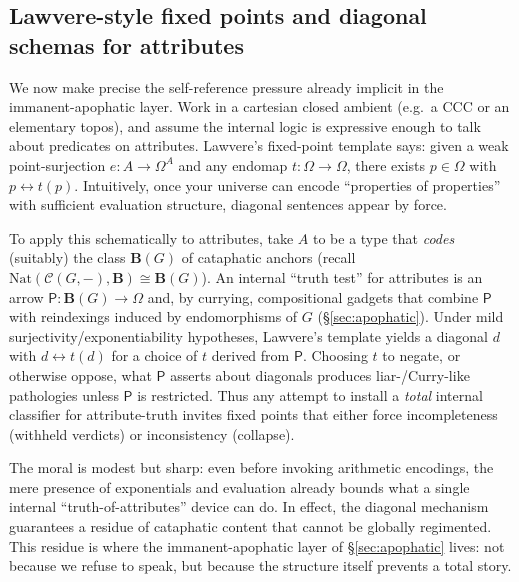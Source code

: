\documentclass[11pt]{article}
\theoremstyle{upright}
\begin{document}
\subsection{Lawvere-style fixed points and diagonal schemas for attributes}
We now make precise the self-reference pressure already implicit in the immanent-apophatic layer. Work in a cartesian closed ambient (e.g.\ a CCC or an elementary topos), and assume the internal logic is expressive enough to talk about predicates on attributes. Lawvere’s fixed-point template says: given a weak point-surjection \(e:A\to \Omega^{A}\) and any endomap \(t:\Omega\to\Omega\), there exists \(p\in\Omega\) with \(p \leftrightarrow t(p)\). Intuitively, once your universe can encode “properties of properties” with sufficient evaluation structure, diagonal sentences appear by force.

To apply this schematically to attributes, take \(A\) to be a type that \emph{codes} (suitably) the class \(\mathbf B(G)\) of cataphatic anchors (recall \(\mathrm{Nat}(\mathcal C(G,-),\mathbf B)\cong \mathbf B(G)\)). An internal “truth test” for attributes is an arrow \(\mathsf{P}:\mathbf B(G)\to\Omega\) and, by currying, compositional gadgets that combine \(\mathsf{P}\) with reindexings induced by endomorphisms of \(G\) (\S\ref{sec:apophatic}). Under mild surjectivity/exponentiability hypotheses, Lawvere’s template yields a diagonal \(d\) with \(d \leftrightarrow t(d)\) for a choice of \(t\) derived from \(\mathsf{P}\). Choosing \(t\) to negate, or otherwise oppose, what \(\mathsf{P}\) asserts about diagonals produces liar-/Curry-like pathologies unless \(\mathsf{P}\) is restricted. Thus any attempt to install a \emph{total} internal classifier for attribute-truth invites fixed points that either force incompleteness (withheld verdicts) or inconsistency (collapse).

The moral is modest but sharp: even before invoking arithmetic encodings, the mere presence of exponentials and evaluation already bounds what a single internal “truth-of-attributes” device can do. In effect, the diagonal mechanism guarantees a residue of cataphatic content that cannot be globally regimented. This residue is where the immanent-apophatic layer of \S\ref{sec:apophatic} lives: not because we refuse to speak, but because the structure itself prevents a total story.
\end{document}
